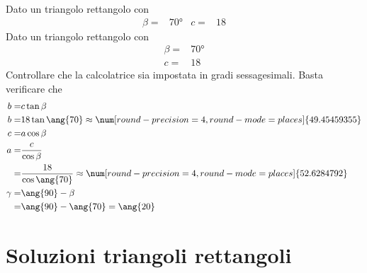 \begin{exercise}
	Dato un triangolo rettangolo con
	\begin{align*}
	\beta=&\ang{70}&
	c=&18
	\end{align*}
	\tcblower
	Dato un triangolo rettangolo con
	\begin{align*}
	\beta=&\ang{70}\\
c=&18
	\end{align*}
	Controllare che la calcolatrice sia impostata in gradi sessagesimali.
	Basta verificare che \testgradi 
\begin{align*}
b=&c\tan\beta\\
b=&18\tan\ang{70}\approx\num[round-precision=\lungarrotandamento,round-mode=places]{49.45459355}\\
c=&a\cos\beta\\
a=&\dfrac{c}{\cos\beta}\\
=&\dfrac{18}{\cos\ang{70}}\approx\num[round-precision=\lungarrotandamento,round-mode=places]{52.6284792}\\
\gamma=&\ang{90}-\beta\\
=&\ang{90}-\ang{70}=\ang{20}\\
\end{align*}
	\end{exercise}
\tcbstoprecording
 \newpage
 \section{Soluzioni triangoli rettangoli}
 \tcbinputrecords